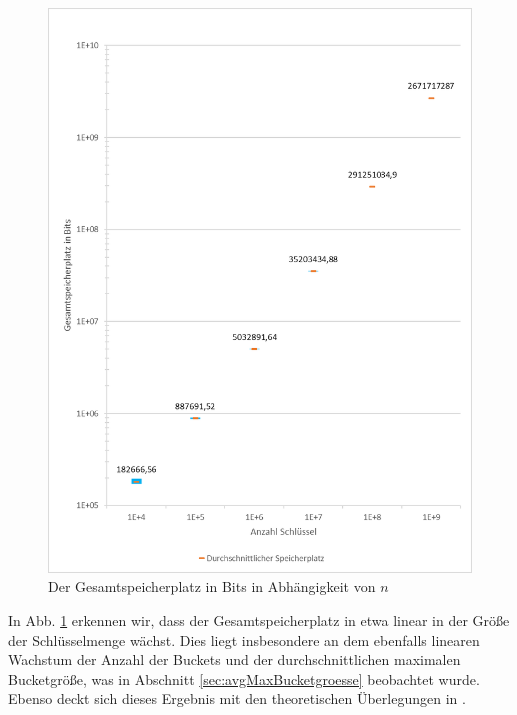 \documentclass[a4paper,12pt,twoside]{report}
\begin{document}
\begin{figure}[tbhp]
\centering
\includegraphics[width=\textwidth]{diagrams/Speicherplatz.png} 
\caption{Der Gesamtspeicherplatz in Bits in Abhängigkeit von $n$}
\label{img:Speicherplatz}
\end{figure}
In Abb. \ref{img:Speicherplatz} erkennen wir, dass der Gesamtspeicherplatz in etwa linear in der Größe der Schlüsselmenge wächst.
Dies liegt insbesondere an dem ebenfalls linearen Wachstum der Anzahl der Buckets und der durchschnittlichen maximalen Bucketgröße, was in Abschnitt \ref{sec:avgMaxBucketgroesse} beobachtet wurde.
Ebenso deckt sich dieses Ergebnis mit den theoretischen Überlegungen in \cite{Botelho2013108}.
\end{document}
